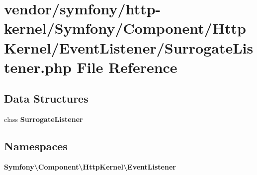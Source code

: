 \section{vendor/symfony/http-\/kernel/\+Symfony/\+Component/\+Http\+Kernel/\+Event\+Listener/\+Surrogate\+Listener.php File Reference}
\label{_surrogate_listener_8php}
\subsection*{Data Structures}
\begin{DoxyCompactItemize}
\item 
class {\bf Surrogate\+Listener}
\end{DoxyCompactItemize}
\subsection*{Namespaces}
\begin{DoxyCompactItemize}
\item 
 {\bf Symfony\textbackslash{}\+Component\textbackslash{}\+Http\+Kernel\textbackslash{}\+Event\+Listener}
\end{DoxyCompactItemize}
